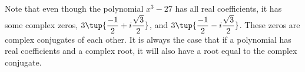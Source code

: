 Note that even though the polynomial $x^{3}-27$ has all real coefficients,
it has some complex zeros, $3\tup{\displaystyle
\frac{-1}{2}+i\displaystyle\frac{\sqrt{3}}{2}}$, and $3\tup{
\displaystyle\frac{-1}{2}-i\displaystyle\frac{\sqrt{3}}{2}}$. 
These zeros are complex conjugates of each other. It is always the case that if a polynomial has real 
coefficients and a complex root, it will also
have a root equal to the complex conjugate.
